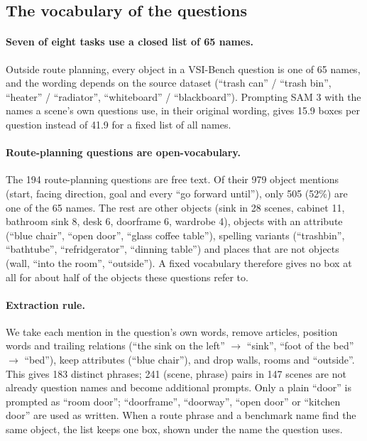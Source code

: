 \subsection{The vocabulary of the questions}

\paragraph{Seven of eight tasks use a closed list of 65 names.}
Outside route planning, every object in a VSI-Bench question is one of 65 names, and the wording depends on the
source dataset (``trash can'' / ``trash bin'', ``heater'' / ``radiator'', ``whiteboard'' / ``blackboard'').
Prompting SAM 3 with the names a scene's own questions use, in their original wording, gives 15.9 boxes per
question instead of 41.9 for a fixed list of all names.

\paragraph{Route-planning questions are open-vocabulary.}
The 194 route-planning questions are free text. Of their 979 object mentions (start, facing direction, goal and
every ``go forward until''), only 505 (52\%) are one of the 65 names. The rest are other objects
(sink in 28 scenes, cabinet 11, bathroom sink 8, desk 6, doorframe 6, wardrobe 4),
objects with an attribute (``blue chair'', ``open door'', ``glass coffee table''),
spelling variants (``trashbin'', ``bathtube'', ``refridgerator'', ``dinning table'')
and places that are not objects (wall, ``into the room'', ``outside'').
A fixed vocabulary therefore gives no box at all for about half of the objects these questions refer to.

\paragraph{Extraction rule.}
We take each mention in the question's own words, remove articles, position words and trailing relations
(``the sink on the left'' $\to$ ``sink'', ``foot of the bed'' $\to$ ``bed''), keep attributes
(``blue chair''), and drop walls, rooms and ``outside''. This gives 183 distinct phrases; 241 (scene, phrase)
pairs in 147 scenes are not already question names and become additional prompts. Only a plain ``door'' is
prompted as ``room door''; ``doorframe'', ``doorway'', ``open door'' or ``kitchen door'' are used as written.
When a route phrase and a benchmark name find the same object, the list keeps one box, shown under the name the
question uses.

